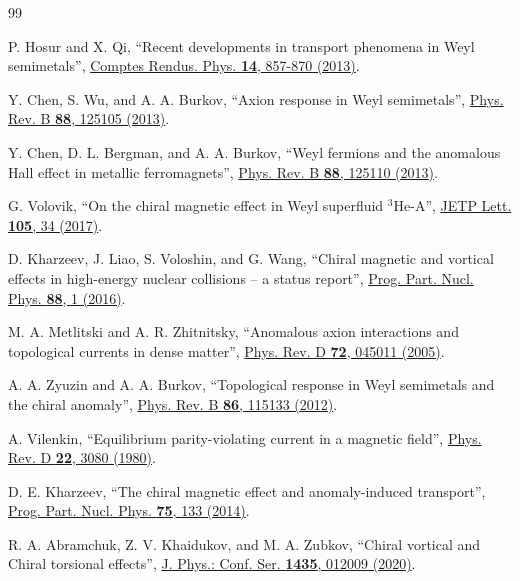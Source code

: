 \documentclass[12pt,prd,showkeys,amsmath,amssymb,nofootinbib]{revtex4-1}
\begin{document}
\begin{thebibliography}{99}

P. Hosur and X. Qi, ``Recent developments in transport phenomena in Weyl semimetals'',
\href{https://doi.org/https://doi.org/10.1016/j.crhy.2013.10.010}{Comptes Rendus. Phys. {\bf 14}, 857-870  (2013)}.
  
Y. Chen, S. Wu, and A. A. Burkov, ``Axion response in Weyl semimetals'', 
\href{https://doi.org/10.1103/PhysRevB.88.125105}{Phys. Rev. B {\bf 88}, 125105 (2013)}.

Y. Chen, D. L. Bergman, and A. A. Burkov, ``Weyl fermions and the anomalous Hall effect in metallic ferromagnets'',
\href{https://doi.org/10.1103/PhysRevB.88.125110}{Phys. Rev. B {\bf 88}, 125110 (2013)}.

G. Volovik, ``On the chiral magnetic effect in Weyl superfluid $^3$He-A'',
\href{https://doi.org/10.1134/S0021364017010076}{JETP Lett. {\bf 105}, 34 (2017)}.

D. Kharzeev, J. Liao, S. Voloshin, and G. Wang, ``Chiral magnetic and vortical effects in
high-energy nuclear collisions -- a status report'',
\href{https://doi.org/https://doi.org/10.1016/j.ppnp.2016.01.001}{Prog. Part. Nucl. Phys. {\bf 88}, 1 (2016)}. 

M. A. Metlitski and A. R. Zhitnitsky,
``Anomalous axion interactions and topological currents in dense matter'',
\href{https://doi.org/10.1103/PhysRevD.72.045011}{Phys. Rev. D {\bf 72}, 045011 (2005)}. 

A. A. Zyuzin and A. A. Burkov, ``Topological response in Weyl semimetals and the chiral anomaly'',
\href{https://doi.org/10.1103/PhysRevB.86.115133}{Phys. Rev. B {\bf 86}, 115133 (2012)}.

A. Vilenkin, ``Equilibrium parity-violating current in a magnetic field'',
\href{https://doi.org/10.1103/PhysRevD.22.3080}{Phys. Rev. D {\bf 22}, 3080 (1980)}.
  
D. E. Kharzeev, ``The chiral magnetic effect and anomaly-induced transport'',
\href{https://doi.org/https://doi.org/10.1016/j.ppnp.2014.01.002}{Prog. Part. Nucl. Phys. {\bf 75}, 133 (2014)}.

R. A. Abramchuk, Z. V. Khaidukov, and M. A. Zubkov, ``Chiral vortical and Chiral torsional effects'', 
\href{https://doi.org/10.1088/1742-6596/1435/1/012009}{J. Phys.: Conf. Ser. {\bf 1435}, 012009 (2020)}. 


\end{thebibliography}
\end{document}
